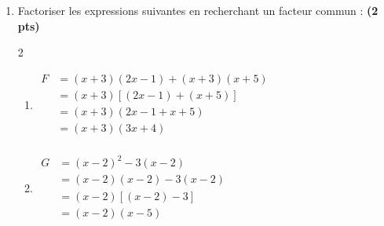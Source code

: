 \documentclass[12pt,a4paper]{article}
\begin{document}
\begin{enumerate}
    \item Factoriser les expressions suivantes en recherchant un facteur commun : \textbf{(2 pts)}

\begin{multicols}{2}
\setlength{\columnseprule}{0.1mm}
\begin{enumerate}
\item[]
\(
\begin{aligned}
F&=(x + 3)(2x - 1) + (x + 3)(x + 5)\\
&=(x + 3)[(2x - 1) + (x + 5)]\\
&=(x + 3)(2x - 1 + x + 5)\\
&=(x + 3)(3x + 4)\\
\end{aligned}
\)
\item[]
\(
\begin{aligned}
G&=(x - 2)^2 - 3(x - 2)\\
&=(x - 2)(x - 2) - 3(x - 2)\\
&=(x - 2)[(x - 2) - 3]\\
&=(x - 2)(x - 5)\\
\end{aligned}
\)
\end{enumerate}
\end{multicols}     
    
\end{enumerate}
\newpage
\end{document}
